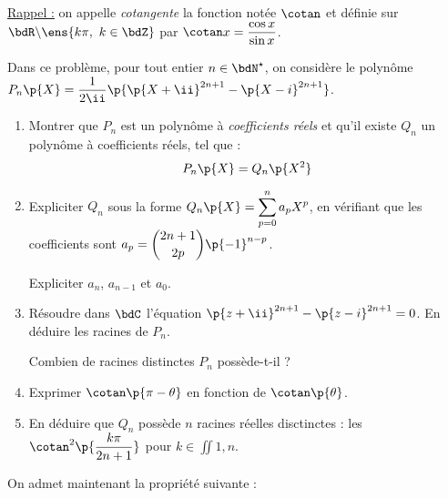 \documentclass[a4paper,french,bookmarks]{article}
\begin{document}
    \renewcommand{\thesection}{\Roman{section}}
    \renewcommand{\labelenumi}{\arabic{enumi}.}
    
    
    \underline{Rappel :} on appelle \emph{cotangente} la fonction notée $\cotan$ et définie sur $\bdR \backslash \ens{k\pi,\ k \in \bdZ}$ par $\cotan x= \dfrac{\cos x}{\sin x}$.
    
    Dans ce problème, pour tout entier $n \in \bdN^\star$, on considère le polynôme $P_n\p{X} = \dfrac{1}{2\ii}\p{\p{X + \ii}^{2n+1} - \p{X -i}^{2n+1}}$.
    
    \begin{enumerate}
        \item Montrer que $P_n$ est un polynôme à \emph{coefficients réels} et qu'il existe $Q_n$ un polynôme à coefficients réels, tel que :
        \[ P_n\p{X} = Q_n\p{X^2}\]
        
        \item Expliciter $Q_n$ sous la forme $Q_n\p{X} = \displaystyle\sum_{p=0}^n a_pX^p$, en vérifiant que les coefficients sont $a_p = \dbinom{2n+1}{2p}\p{-1}^{n-p}$.
        
        Expliciter $a_n$, $a_{n-1}$ et $a_0$.
        
        \item Résoudre dans $\bdC$ l'équation $\p{z + \ii}^{2n+1} - \p{z -i}^{2n+1} = 0$. En déduire les racines de $P_n$.
        
        Combien de racines distinctes $P_n$ possède-t-il ?
        
        \item Exprimer $\cotan\p{\pi - \theta}$ en fonction de $\cotan\p{\theta}$.
        
        \item En déduire que $Q_n$ possède $n$ racines réelles disctinctes : \quad les $\cotan^2\p{\dfrac{k\pi}{2n + 1}}$ pour $k \in \iint{1, n}$.
    \end{enumerate}
    On admet maintenant la propriété suivante :
    
\end{document}
